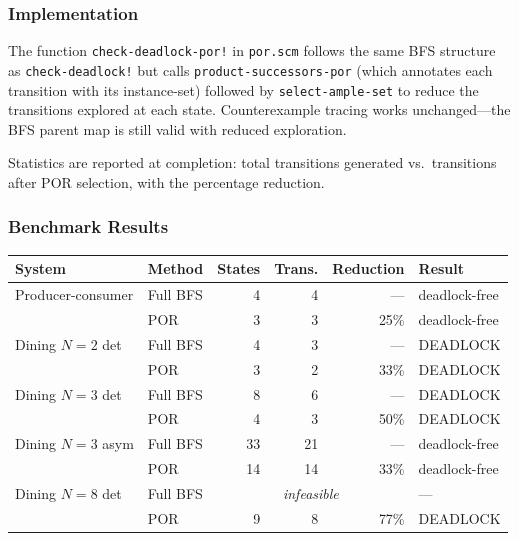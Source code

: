 \documentclass[11pt]{article}
\begin{document}
\subsubsection{Implementation}

The function \texttt{check-deadlock-por!} in \texttt{por.scm}
follows the same BFS structure as \texttt{check-deadlock!} but calls
\texttt{product-successors-por} (which annotates each transition with
its instance-set) followed by \texttt{select-ample-set} to reduce the
transitions explored at each state.  Counterexample tracing works
unchanged---the BFS parent map is still valid with reduced exploration.

Statistics are reported at completion: total transitions generated
vs.\ transitions after POR selection, with the percentage reduction.

\subsubsection{Benchmark Results}

\begin{center}
\begin{tabular}{llrrrl}
\toprule
\textbf{System} & \textbf{Method} & \textbf{States} & \textbf{Trans.} & \textbf{Reduction} & \textbf{Result} \\
\midrule
Producer-consumer & Full BFS     & 4  & 4  & ---  & deadlock-free \\
                  & POR          & 3  & 3  & 25\% & deadlock-free \\
\midrule
Dining $N{=}2$ det & Full BFS   & 4  & 3  & ---  & DEADLOCK \\
                    & POR        & 3  & 2  & 33\% & DEADLOCK \\
\midrule
Dining $N{=}3$ det & Full BFS   & 8  & 6  & ---  & DEADLOCK \\
                    & POR        & 4  & 3  & 50\% & DEADLOCK \\
\midrule
Dining $N{=}3$ asym & Full BFS  & 33 & 21 & ---  & deadlock-free \\
                     & POR       & 14 & 14 & 33\% & deadlock-free \\
\midrule
Dining $N{=}8$ det  & Full BFS  & \multicolumn{3}{c}{\textit{infeasible}} & --- \\
                     & POR       & 9  & 8  & 77\% & DEADLOCK \\
\bottomrule
\end{tabular}
\end{center}
\end{document}
